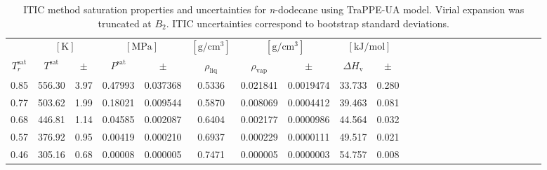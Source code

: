 \documentclass[%
 aip,
 jcp,
 sd,%
 amsmath,amssymb,
 reprint,%
]{revtex4-1}
\begin{document}
\begin{table}[]
\centering
\caption{ITIC method saturation properties and uncertainties for \textit{n}-dodecane using TraPPE-UA model. Virial expansion was truncated at $B_2$. ITIC uncertainties correspond to bootstrap standard deviations.}
\label{tab:EXAMPLE-SIM/TraPPE-C12}
\begin{ruledtabular}
\begin{tabular}{cccccccccccccccccccccccc}
 & \multicolumn{2}{c}{$[\mathrm{K}]$} &	 \multicolumn{2}{c}{$[\mathrm{MPa}]$} & $[\mathrm{g/cm^3}]$ & \multicolumn{2}{c}{$[\mathrm{g/cm^3}]$} & \multicolumn{2}{c}{$[\mathrm{kJ/mol}]$} \\
$T_r^{\mathrm{sat}}$ & $T^{\mathrm{sat}}$ & $\pm$ & $P^{\mathrm{sat}}$ & $\pm$ & $\rho_{\mathrm{liq}}$ & $\rho_{\mathrm{vap}}$ & $\pm$ & $\Delta H_{\mathrm{v}}$ & $\pm$
 \\
\hline													
0.85	&	556.30	&	3.97	&	0.47993	&	0.037368	&	0.5336	&	0.021841	&	0.0019474	&	33.733	&	0.280	\\
0.77	&	503.62	&	1.99	&	0.18021	&	0.009544	&	0.5870	&	0.008069	&	0.0004412	&	39.463	&	0.081	\\
0.68	&	446.81	&	1.14	&	0.04585	&	0.002087	&	0.6404	&	0.002177	&	0.0000986	&	44.564	&	0.032	\\
0.57	&	376.92	&	0.95	&	0.00419	&	0.000210	&	0.6937	&	0.000229	&	0.0000111	&	49.517	&	0.021	\\
0.46	&	305.16	&	0.68	&	0.00008	&	0.000005	&	0.7471	&	0.000005	&	0.0000003	&	54.757	&	0.008	\\				
\end{tabular}
\end{ruledtabular}
\end{table}
\end{document}
